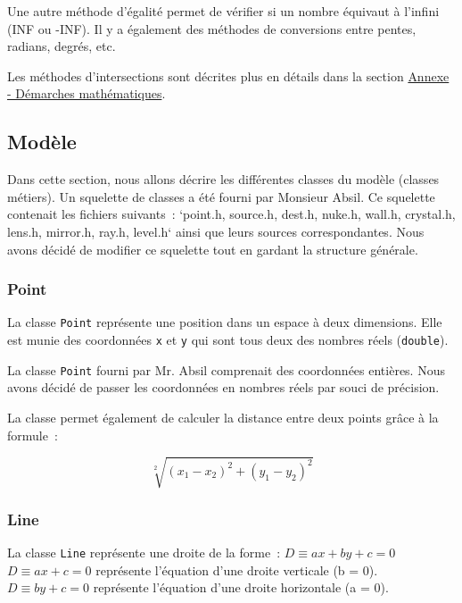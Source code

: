 \documentclass[]{article}
\begin{document}
Une autre méthode d’égalité permet de vérifier si un nombre équivaut à l’infini (INF ou -INF).
Il y a également des méthodes de conversions entre pentes, radians, degrés, etc.

Les méthodes d’intersections sont décrites plus en détails dans la section \hyperref[Annexe]{Annexe - Démarches mathématiques}.

\subsection{Modèle}

Dans cette section, nous allons décrire les différentes classes du modèle 
(classes métiers).
Un squelette de classes a été fourni par Monsieur Absil.
Ce squelette contenait les fichiers suivants~:
`point.h, source.h, dest.h, nuke.h, wall.h,
crystal.h, lens.h, mirror.h, ray.h, level.h` ainsi que leurs sources correspondantes.
Nous avons décidé de modifier ce squelette tout en gardant la 
structure générale.

\subsubsection{\label{Point}Point}

La classe \texttt{Point} représente une position dans un espace à deux dimensions. 
Elle est munie des coordonnées \texttt{x} et \texttt{y} qui sont tous deux des
nombres réels (\texttt{double}). 

La classe \texttt{Point} fourni par Mr. Absil comprenait des coordonnées entières.
Nous avons décidé de passer les coordonnées en nombres réels par souci de précision.

La classe permet également de calculer la distance entre deux points grâce à la formule~:

$$ \sqrt[2]{(x_1 - x_2)^2 + (y_1 - y_2)^2} $$

\newpage
\subsubsection{\label{Line}Line}

La classe \texttt{Line} représente une droite de la forme~: 
$ D \equiv ax + by + c = 0 $ \\

$ D \equiv ax + c = 0 $ représente l'équation d'une droite verticale (b = 0). \\
$ D \equiv by + c = 0 $ représente l'équation d'une droite horizontale (a = 0). \\
\end{document}
